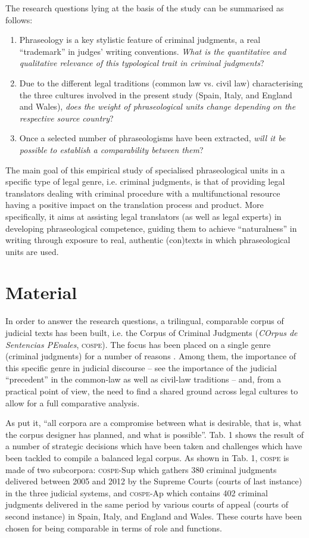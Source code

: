 \documentclass[output=paper]{LSP/langsci}
\begin{document}
The research questions lying at the basis of the study can be summarised as follows:

\begin{enumerate}
\item Phraseology is a key stylistic feature of criminal judgments, a real “trademark” in judges’ writing conventions. \textit{What is the quantitative and qualitative relevance of this typological trait in criminal judgments}? 
\item Due to the different legal traditions (common law vs. civil law) characterising the three cultures involved in the present study (Spain, Italy, and England and Wales), \textit{does the weight of phraseological units change depending on the respective source country}? 
\item Once a selected number of phraseologisms have been extracted, \textit{will it be possible to establish a comparability between them}?
\end{enumerate}

The main goal of this empirical study of specialised phraseological units in a specific type of legal genre, i.e. criminal judgments, is that of providing legal translators dealing with criminal procedure with a multifunctional resource having a positive impact on the translation process and product. More specifically, it aims at assisting legal translators (as well as legal experts) in developing phraseological competence, guiding them to achieve “naturalness” in writing through exposure to real, authentic (con)texts in which phraseological units are used.

\section{Material}
In order to answer the research questions, a trilingual, comparable corpus of judicial texts has been built, i.e. the Corpus of Criminal Judgments (\textit{COrpus de Sentencias PEnales}, \textsc{cospe}). The focus has been placed on a single genre (criminal judgments) for a number of reasons \citep[see][171--181]{Pontrandolfo2013a}. Among them, the importance of this specific genre in judicial discourse – see the importance of the judicial “precedent” in the common-law as well as civil-law traditions – and, from a practical point of view, the need to find a shared ground across legal cultures to allow for a full comparative analysis.

As \citet[156--157]{Hunston2008} put it, “all corpora are a compromise between what is desirable, that is, what the corpus designer has planned, and what is possible”. Tab. 1 shows the result of a number of strategic decisions which have been taken and challenges which have been tackled to compile a balanced legal corpus. As shown in Tab. 1, \textsc{cospe} is made of two subcorpora: \textsc{cospe}-\textsc{S}up which gathers 380 criminal judgments delivered between 2005 and 2012 by the Supreme Courts (courts of last instance) in the three judicial systems, and \textsc{cospe}-\textsc{A}p which contains 402 criminal judgments delivered in the same period by various courts of appeal (courts of second instance) in Spain, Italy, and England and Wales. These courts have been chosen for being comparable in terms of role and functions.
\end{document}
